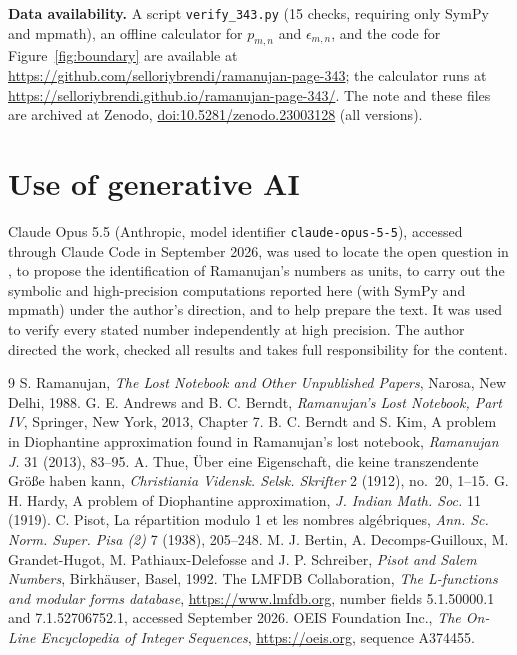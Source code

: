 \documentclass[11pt]{article}
\theoremstyle{remark}
\begin{document}
\medskip\noindent\textbf{Data availability.} A script \texttt{verify\_343.py} (15 checks, requiring only SymPy and mpmath), an offline
calculator for $p_{m,n}$ and $\epsilon_{m,n}$, and the code for Figure~\ref{fig:boundary} are available at
\url{https://github.com/selloriybrendi/ramanujan-page-343}; the calculator runs at
\url{https://selloriybrendi.github.io/ramanujan-page-343/}. The note and these files are archived at Zenodo,
\href{https://doi.org/10.5281/zenodo.23003128}{doi:10.5281/zenodo.23003128} (all versions).

\section*{Use of generative AI}
Claude Opus 5.5 (Anthropic, model identifier \texttt{claude-opus-5-5}), accessed through Claude Code in September 2026, was used to
locate the open question in \cite{AB4}, to propose the identification of Ramanujan's numbers as units, to carry out the symbolic and
high-precision computations reported here (with SymPy and mpmath) under the author's direction, and to help prepare the text. It was used
to verify every stated number independently at high precision. The author directed the work, checked all results and takes full
responsibility for the content.

\begin{thebibliography}{9}
 S. Ramanujan, \emph{The Lost Notebook and Other Unpublished Papers}, Narosa, New Delhi, 1988.
 G. E. Andrews and B. C. Berndt, \emph{Ramanujan's Lost Notebook, Part IV}, Springer, New York, 2013, Chapter 7.
 B. C. Berndt and S. Kim, A problem in Diophantine approximation found in Ramanujan's lost notebook, \emph{Ramanujan J.}
31 (2013), 83--95.
 A. Thue, \"Uber eine Eigenschaft, die keine transzendente Gr\"o{\ss}e haben kann, \emph{Christiania Vidensk. Selsk.
Skrifter} 2 (1912), no.~20, 1--15.
 G. H. Hardy, A problem of Diophantine approximation, \emph{J. Indian Math. Soc.} 11 (1919).
 C. Pisot, La r\'epartition modulo 1 et les nombres alg\'ebriques, \emph{Ann. Sc. Norm. Super. Pisa (2)} 7 (1938),
205--248.
 M. J. Bertin, A. Decomps-Guilloux, M. Grandet-Hugot, M. Pathiaux-Delefosse and J. P. Schreiber, \emph{Pisot and Salem
Numbers}, Birkh\"auser, Basel, 1992.
 The LMFDB Collaboration, \emph{The L-functions and modular forms database}, \url{https://www.lmfdb.org}, number fields
5.1.50000.1 and 7.1.52706752.1, accessed September 2026.
 OEIS Foundation Inc., \emph{The On-Line Encyclopedia of Integer Sequences}, \url{https://oeis.org}, sequence A374455.
\end{thebibliography}
\end{document}
